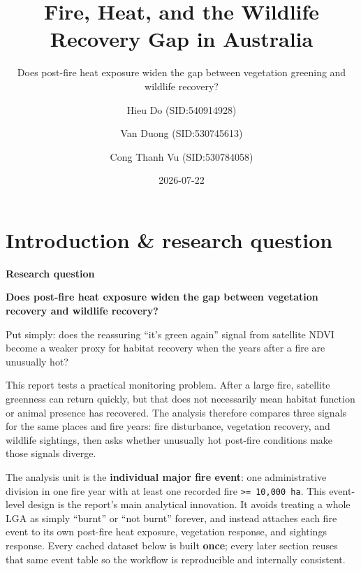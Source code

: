 \documentclass[
  letterpaper,
  DIV=11,
  numbers=noendperiod]{scrartcl}
\title{Fire, Heat, and the Wildlife Recovery Gap in Australia}
\subtitle{Does post-fire heat exposure widen the gap between vegetation
greening and wildlife recovery?}
\author{Hieu Do (SID:540914928) \and Van Duong (SID:530745613) \and Cong
Thanh Vu (SID:530784058)}
\date{2026-07-22}
\begin{document}
\maketitle


\section{Introduction \& research
question}\label{introduction-research-question}

\begin{tcolorbox}[enhanced jigsaw, left=2mm, opacityback=0, colback=white, breakable, arc=.35mm, bottomrule=.15mm, rightrule=.15mm, toprule=.15mm, colframe=quarto-callout-note-color-frame, leftrule=.75mm]
\begin{minipage}[t]{5.5mm}
\textcolor{quarto-callout-note-color}{\faInfo}
\end{minipage}%
\begin{minipage}[t]{\textwidth - 5.5mm}

\vspace{-3mm}\textbf{Research question}\vspace{3mm}

\textbf{Does post-fire heat exposure widen the gap between vegetation
recovery and wildlife recovery?}

Put simply: does the reassuring ``it's green again'' signal from
satellite NDVI become a weaker proxy for habitat recovery when the years
after a fire are unusually hot?

\end{minipage}%
\end{tcolorbox}

This report tests a practical monitoring problem. After a large fire,
satellite greenness can return quickly, but that does not necessarily
mean habitat function or animal presence has recovered. The analysis
therefore compares three signals for the same places and fire years:
fire disturbance, vegetation recovery, and wildlife sightings, then asks
whether unusually hot post-fire conditions make those signals diverge.

The analysis unit is the \textbf{individual major fire event}: one
administrative division in one fire year with at least one recorded fire
\texttt{\textgreater{}=\ 10,000\ ha}. This event-level design is the
report's main analytical innovation. It avoids treating a whole LGA as
simply ``burnt'' or ``not burnt'' forever, and instead attaches each
fire event to its own post-fire heat exposure, vegetation response, and
sightings response. Every cached dataset below is built \textbf{once};
every later section reuses that same event table so the workflow is
reproducible and internally consistent.
\end{document}

